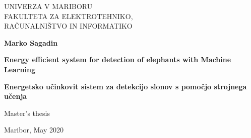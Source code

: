\begin{titlepage}
    \begin{center}
 
        \fontsize{16}{26}
        \selectfont
        UNIVERZA V MARIBORU\\
        FAKULTETA ZA ELEKTROTEHNIKO,\\
        RAČUNALNIŠTVO IN INFORMATIKO
        \vspace*{3.0cm}

        \textbf{Marko Sagadin}

        \vspace{0.5cm}

        \fontsize{26}{26}
        \selectfont
        \textbf{Energy efficient system for detection of elephants with Machine Learning}
 
        \vspace{1.0cm}

        \fontsize{26}{26}
        \selectfont
        \textbf{Energetsko učinkovit sistem za detekcijo slonov s pomočjo strojnega učenja}

        \vspace{0.5cm}

        \fontsize{16}{18}
        \selectfont
        Master's thesis
 
        \vspace*{\fill}

        Maribor, May 2020 
 
 
    \end{center}
\end{titlepage}
